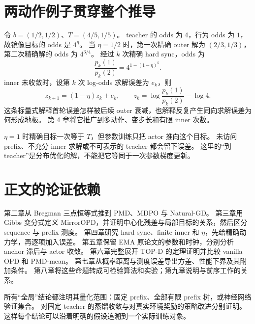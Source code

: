 \section{两动作例子贯穿整个推导}
令 $b=(1/2,1/2)$、$T=(4/5,1/5)$。
teacher 的 odds 为 $4$，行为 odds 为 $1$，故镜像目标的 odds 是 $4^\eta$。
当 $\eta=1/2$ 时，第一次精确 outer 解为 $(2/3,1/3)$，第二次精确解的 odds 为 $4^{3/4}$。
经过 $k$ 次精确 hard sync，odds 为
\[
 \frac{p_k(1)}{p_k(2)}=4^{1-(1-\eta)^k}.
\]
inner 未收敛时，设第 $k$ 次 log-odds 求解误差为 $e_k$，则
\[
 z_{k+1}=(1-\eta)z_k+e_k,
 \qquad z_k=\log\frac{p_k(1)}{p_k(2)}-\log4.
\]
这条标量式解释首轮误差怎样被后续 outer 衰减，也解释反复产生同向求解误差为何形成地板。
第 4 章将它推广到多动作、变步长和有限 inner 次数。

$\eta=1$ 时精确目标一次等于 $T$，但参数训练只把 actor 推向这个目标。
未访问 prefix、不充分 inner 求解或不可表示的 teacher 都会留下误差。
这里的“到 teacher”是分布优化的解，不能把它等同于一次参数梯度更新。

\section{正文的论证依赖}
第二章从 Bregman 三点恒等式推到 PMD、MDPO 与 Natural-GD。
第三章用 Gibbs 变分式定义 MirrorOPD，并证明中心化残差与局部目标的关系，然后区分 sequence 与 prefix 测度。
第四章研究 hard sync、finite inner 和 $\eta$，先给精确动力学，再逐项加入误差。
第五章保留 EMA 原论文的参数和时钟，分别分析 anchor 滞后与 actor 收敛。
第六章完整展开 TOP-D 的定理证明并比较 vanilla OPD 和 PMD-mean。
第七章从概率距离与测度误差导出方差、性能下界及其附加条件。
第八章将这些命题转成可检验算法和实验；第九章说明与前序工作的关系。

所有“全局”结论都注明其量化范围：固定 prefix、全部有限 prefix 树，或神经网络验证集合。
对固定 teacher 的蒸馏收敛与对真实环境奖励的策略改进分别证明。
这样每个结论可以沿着明确的假设追溯到一个实际训练对象。
